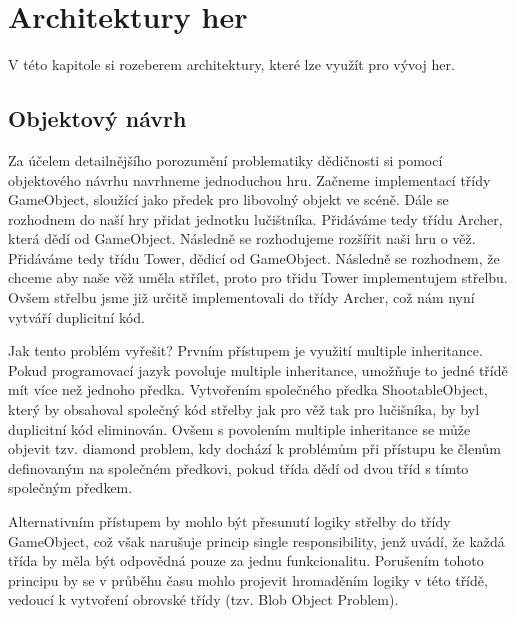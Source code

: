 
\chapter{Architektury her}
V této kapitole si rozeberem architektury, které lze využít pro vývoj her.



\section{Objektový návrh}
Za účelem detailnějšího porozumění problematiky dědičnosti si pomocí objektového návrhu navrhneme jednoduchou hru. Začneme implementací třídy GameObject, sloužící jako předek pro libovolný objekt ve scéně. Dále se rozhodnem do naší hry přidat jednotku lučištníka. Přidáváme tedy třídu Archer, která dědí od GameObject. Následně se rozhodujeme rozšířit naši hru o věž. Přidáváme tedy třídu Tower, dědicí od GameObject. Následně se rozhodnem, že chceme aby naše věž uměla střílet, proto pro třidu Tower implementujem střelbu. Ovšem střelbu jsme již určitě implementovali do třídy Archer, což nám nyní vytváří duplicitní kód.

Jak tento problém vyřešit? Prvním přístupem je využití multiple inheritance. Pokud programovací jazyk povoluje multiple inheritance, umožňuje to jedné třídě mít více než jednoho předka. Vytvořením společného předka ShootableObject, který by obsahoval společný kód střelby jak pro věž tak pro lučišníka, by byl duplicitní kód eliminován. Ovšem s povolením multiple inheritance se může objevit tzv. diamond problem, kdy dochází k problémům při přístupu ke členům definovaným na společném předkovi, pokud třída dědí od dvou tříd s tímto společným předkem.

Alternativním přístupem by mohlo být přesunutí logiky střelby do třídy GameObject, což však narušuje princip single responsibility, jenž uvádí, že každá třída by měla být odpovědná pouze za jednu funkcionalitu. Porušením tohoto principu by se v průběhu času mohlo projevit hromaděním logiky v této třídě, vedoucí k vytvoření obrovské třídy (tzv. Blob Object Problem).

